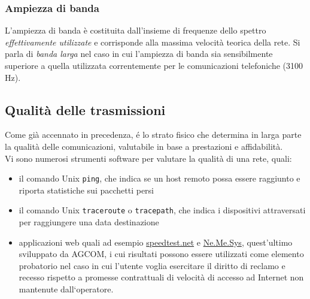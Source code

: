 \documentclass[a4paper,11pt]{article}
\def\code#1{\texttt{#1}}
\def\subsub#1{\subsubsection{#1}\label{#1}}
\begin{document}
\subsub{Ampiezza di banda}
L'ampiezza di banda è costituita dall'insieme di frequenze dello spettro \textit{effettivamente utilizzate} e corrisponde alla massima velocità teorica della rete. Si parla di \textit{banda larga} nel caso in cui l'ampiezza di banda sia sensibilmente superiore a quella utilizzata correntemente per le comunicazioni telefoniche (3100 Hz).

\subsection{Qualità delle trasmissioni}
Come già accennato in precedenza, é lo strato fisico che determina in larga parte la qualità delle comunicazioni, valutabile in base a prestazioni e affidabilità. 
\\Vi sono numerosi strumenti software per valutare la qualità di una rete, quali:
\begin{itemize}
\item il comando Unix \code{ping}, che indica se un host remoto possa essere raggiunto e riporta statistiche sui pacchetti persi
\item il comando Unix \code{traceroute} o \code{tracepath}, che indica i dispositivi attraversati per raggiungere una data destinazione
\item applicazioni web quali ad esempio \url{speedtest.net} e \href{<https://www.misurainternet.it/>}{Ne.Me.Sys}, quest'ultimo sviluppato da AGCOM, i cui risultati possono essere utilizzati come elemento probatorio nel caso in cui l’utente voglia esercitare il diritto di reclamo e recesso rispetto a promesse contrattuali di velocità di accesso ad Internet non mantenute dall‘operatore.
\end{itemize}
\end{document}
